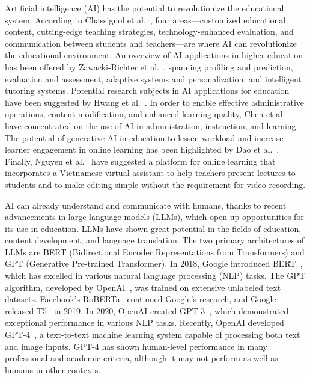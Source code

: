 \documentclass{article}
\begin{document}
	Artificial intelligence (AI) has the potential to revolutionize the educational system. According to Chassignol et al.~\cite{chassignol2018artificial}, four areas—customized educational content, cutting-edge teaching strategies, technology-enhanced evaluation, and communication between students and teachers—are where AI can revolutionize the educational environment. An overview of AI applications in higher education has been offered by Zawacki-Richter et al.~\cite{zawacki2019systematic}, spanning profiling and prediction, evaluation and assessment, adaptive systems and personalization, and intelligent tutoring systems. Potential research subjects in AI applications for education have been suggested by Hwang et al.~\cite{hwang2020vision}. In order to enable effective administrative operations, content modification, and enhanced learning quality, Chen et al.~\cite{chen2020artificial} have concentrated on the use of AI in administration, instruction, and learning. The potential of generative AI in education to lessen workload and increase learner engagement in online learning has been highlighted by Dao et al.~\cite{Dao2021}. Finally, Nguyen et al.~\cite{Nguyen2021} have suggested a platform for online learning that incorporates a Vietnamese virtual assistant to help teachers present lectures to students and to make editing simple without the requirement for video recording.
	
	AI can already understand and communicate with humans, thanks to recent advancements in large language models (LLMs), which open up opportunities for its use in education. LLMs have shown great potential in the fields of education, content development, and language translation. The two primary architectures of LLMs are BERT (Bidirectional Encoder Representations from Transformers) and GPT (Generative Pre-trained Transformer).  In 2018, Google introduced BERT~\cite{devlin2018bert}, which has excelled in various natural language processing (NLP) tasks. The GPT algorithm, developed by OpenAI~\cite{alec2018improving}, was trained on extensive unlabeled text datasets. Facebook's RoBERTa~\cite{liu2019roberta} continued Google's research, and Google released T5~\cite{raffel2020exploring} in 2019. In 2020, OpenAI created GPT-3~\cite{brown2020language}, which demonstrated exceptional performance in various NLP tasks. Recently, OpenAI developed GPT-4~\cite{OpenAI_gpt_4_report}, a text-to-text machine learning system capable of processing both text and image inputs. GPT-4 has shown human-level performance in many professional and academic criteria, although it may not perform as well as humans in other contexts.
	
\end{document}
